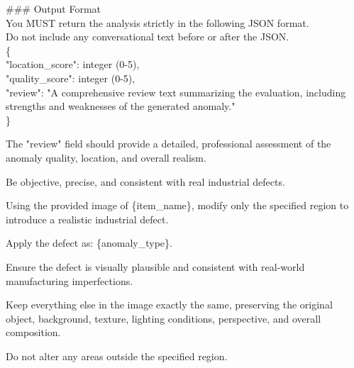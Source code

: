 \documentclass[sigconf]{acmart}
\begin{document}
\begin{tcolorbox}
\vspace{1.5em}
\#\#\# Output Format \\
You MUST return the analysis strictly in the following JSON format. \\
Do not include any conversational text before or after the JSON. \\
\{ \\
\hspace*{1em}"location\_score": integer (0-5), \\
\hspace*{1em}"quality\_score": integer (0-5), \\
\hspace*{1em}"review": "A comprehensive review text summarizing the evaluation, including strengths and weaknesses of the generated anomaly." \\
\}

\vspace{0.5em}
The "review" field should provide a detailed, professional assessment of the anomaly quality, location, and overall realism.

\vspace{0.5em}
Be objective, precise, and consistent with real industrial defects.
\end{tcolorbox}

\vspace{1em}

\begin{tcolorbox}[
    enhanced,
    breakable,             %
    width=\textwidth,      %
    colframe=prompt_front,
    colback=prompt_back,
    coltitle=white,
    boxrule=1pt,
    arc=8pt,
    left=10pt, right=10pt, top=10pt, bottom=10pt,
    fonttitle=\fontsize{14pt}{12pt}\bfseries,
    fontupper=\fontsize{10pt}{12pt}\rmfamily,
    title=\textbf{Fixed Prompt For Comparative Experiment},
]

Using the provided image of \{item\_name\}, modify only the specified region to introduce a realistic industrial defect.

Apply the defect as: \{anomaly\_type\}.

Ensure the defect is visually plausible and consistent with real-world manufacturing imperfections.

Keep everything else in the image exactly the same, preserving the original object, background, texture, lighting conditions, perspective, and overall composition.

Do not alter any areas outside the specified region.
\end{tcolorbox}
\end{document}

